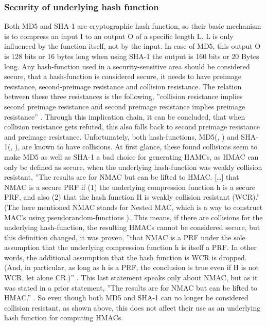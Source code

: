 \subsubsection{Security of underlying hash function}
Both MD5 and SHA-1 are cryptographic hash function, so their basic mechanism is to compress an input I to an output O of a specific length L. L is only influenced by the function itself, not by the input. In case of MD5, this output O is 128 bits or 16 bytes \cite{BAV} long when using SHA-1 the output is 160 bits or 20 Bytes \cite{BAV} long. Any hash-function used in a security-sensitive area should be considered secure, that a hash-function is considered secure, it needs to have preimage resistance, second-preimage resistance and collision resistance. The relation between these three resistances is the following, ''collision resistance implies second preimage resistance and second preimage resistance implies preimage resistance'' \cite{SPR-res}. Through this implication chain, it can be concluded, that when collision resistance gets refuted, this also falls back to second preimage resistance and preimage resistance. Unfortunately, both hash-functions, MD5(\cite{COL1}, \cite{COL2}) and SHA-1(\cite{COL3}, \cite{COL4}), are known to have collisions. At first glance, these found collisions seem to make MD5 as well as SHA-1 a bad choice for generating HAMCs, as HMAC can only be defined as secure, when the underlying hash-function was weakly collision resistant, ''The results are for NMAC but can be lifted to HMAC.
[\dots] that NMAC is a secure PRF if (1) the underlying compression function h is a secure PRF, and also (2) that the hash function H is weakly collision resistant (WCR).'' \cite{HMAC-SEC1}(The here mentioned NMAC stands for Nested MAC, which is a way to construct MAC's using pseudorandom-functions \cite{NMAC}). This means, if there are collisions for the underlying hash-function, the resulting HMACs cannot be considered secure, but this definition changed, it was proven, ''that NMAC is a PRF under the sole assumption that the underlying compression function h is itself a PRF. In other words, the additional assumption that the hash function is WCR is dropped. (And, in particular, as long as h is a PRF, the conclusion is true even if H is not WCR, let alone CR.)'' \cite{HMAC-SEC1}. This last statement speaks only about NMAC, but as it was stated in a prior statement, ''The results are for NMAC but can be lifted to HMAC.'' \cite{HMAC-SEC1}. So even though both MD5 and SHA-1 can no longer be considered collision resistant, as shown above, this does not affect their use as an underlying hash function for computing HMACs.

